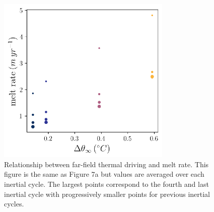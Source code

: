 \documentclass[tc, manuscript]{copernicus}
\begin{document}
\begin{figure}[t]
\includegraphics[width=8.3cm]{figS7.pdf}
\caption{Relationship between far-field thermal driving and melt rate. This figure is the same as Figure 7a but values are averaged over each inertial cycle. The largest points correspond to the fourth and last inertial cycle with progressively smaller points for previous inertial cycles. }
\label{fig:melt_sensitivity_cycles}
\end{figure}
\end{document}
